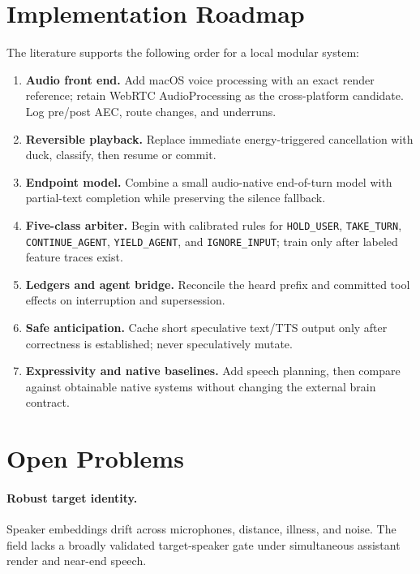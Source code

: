 \documentclass[11pt]{article}
\newcommand{\code}[1]{\texttt{#1}}
\begin{document}
\section{Implementation Roadmap}

The literature supports the following order for a local modular system:

\begin{enumerate}[leftmargin=*]
  \item \textbf{Audio front end.} Add macOS voice processing with an exact
        render reference; retain WebRTC AudioProcessing as the cross-platform
        candidate. Log pre/post AEC, route changes, and underruns.
  \item \textbf{Reversible playback.} Replace immediate energy-triggered
        cancellation with duck, classify, then resume or commit.
  \item \textbf{Endpoint model.} Combine a small audio-native end-of-turn model
        with partial-text completion while preserving the silence fallback.
  \item \textbf{Five-class arbiter.} Begin with calibrated rules for
        \code{HOLD\_USER}, \code{TAKE\_TURN}, \code{CONTINUE\_AGENT},
        \code{YIELD\_AGENT}, and \code{IGNORE\_INPUT}; train only after labeled
        feature traces exist.
  \item \textbf{Ledgers and agent bridge.} Reconcile the heard prefix and
        committed tool effects on interruption and supersession.
  \item \textbf{Safe anticipation.} Cache short speculative text/TTS output
        only after correctness is established; never speculatively mutate.
  \item \textbf{Expressivity and native baselines.} Add speech planning, then
        compare against obtainable native systems without changing the external
        brain contract.
\end{enumerate}

\section{Open Problems}

\paragraph{Robust target identity.}
Speaker embeddings drift across microphones, distance, illness, and noise.
The field lacks a broadly validated target-speaker gate under simultaneous
assistant render and near-end speech.
\end{document}
